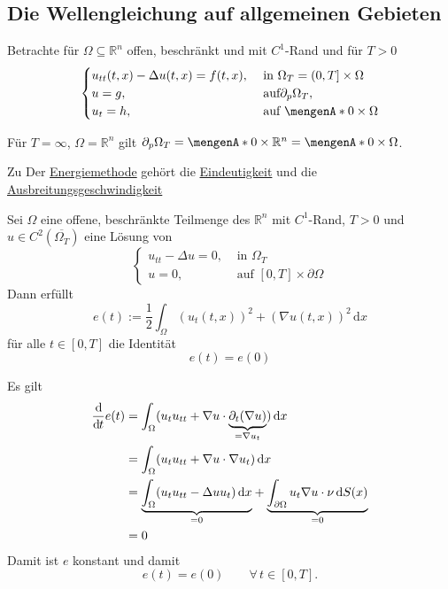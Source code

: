 \subsection{Die Wellengleichung auf allgemeinen Gebieten} 
\label{sub:die_wellengleichung_auf_allgemeinen_gebieten}
Betrachte für $\Omega \subseteq \mathbb{R}^n$ offen, beschränkt und mit $C^1$-Rand und für $T >0$
\[
	\begin{cases}
		u_{tt}(t,x) - \Delta u(t,x) = f(t,x), &\text{ in }\Omega_T = (0,T] \times \Omega\\
		u=g ,&\text{ auf} \partial_p \Omega_T, \\
		u_t=h, &\text{ auf } \set{0} \times \Omega		
	\end{cases}
\]
\begin{bemerkung}
	Für $T= \infty$, $ \Omega = \mathbb{R}^n$ gilt $ \partial _p \Omega_T = \set{0} \times \mathbb{R}^n = \set{0} \times \Omega$.
\end{bemerkung}
Zu Der \underline{Energiemethode} gehört die \underline{Eindeutigkeit} und die \underline{Ausbreitungsgeschwindigkeit} 

\begin{lemma}
	Sei $\Omega$ eine offene, beschränkte Teilmenge des $\mathbb{R}^n$ mit $C^1$-Rand, $T>0$ und $u \in C^2(\overline{\Omega_T})$ eine Lösung von
	\[
		\begin{cases}
			u_{tt}- \Delta u = 0, &\text{ in }\Omega_T\\
			u=0, &\text{ auf }[0,T] \times \partial \Omega
		\end{cases}
	\]
	Dann erfüllt 
	\[
		e(t) := \frac{1}{2} \int_{\Omega}^{} (u_t(t,x))^2 + ( \nabla u(t,x))^2 \,\mathrm{d}x
	\]
	für alle $t \in [0,T]$ die Identität
	\[
		e(t) = e(0) 
	\]
\end{lemma}
\begin{beweis}
	Es gilt
	\begin{align*}
		\frac{\mathrm{d}\mkern-1.0mu }{\mathrm{d}\mkern-1.0mu t} e(t) &= \int_{\Omega}^{}( u_t u_{tt} +  \nabla u \cdot \underset{=  \nabla u_t}{\underbrace{\partial_t (  \nabla u)}}) \,\mathrm{d}x \\
		&= \int_{\Omega}^{}( u_t u_{tt} +  \nabla u \cdot  \nabla u_t) \,\mathrm{d}x \\ 
		&= \underset{=0}{\underbrace{\int_{\Omega}^{} (u_t u_{tt} - \Delta u u_t) \,\mathrm{d}x}} 
		+ \underset{=0}{\underbrace{ \int_{ \partial \Omega}^{} u_t  \nabla u \cdot \nu \,\mathrm{d}S(x)}} \\
		&=0
	\end{align*}
	Damit ist $e$ konstant und damit
	\[
		e(t) = e(0) \qquad \forall\, t \in [0,T].
	\]
\end{beweis}